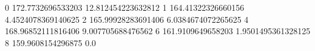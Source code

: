 0 172.7732696533203 12.812454223632812
1 164.41322326660156 4.4524078369140625
2 165.99928283691406 6.0384674072265625
4 168.96852111816406 9.007705688476562
6 161.9109649658203 1.9501495361328125
8 159.9608154296875 0.0
